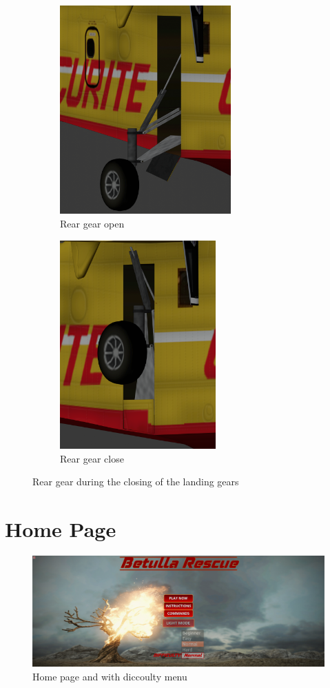 \documentclass{article}
\begin{document}
\begin{figure}[h!]
  \centering
  \begin{subfigure}[h!]{0.4\linewidth}
    \includegraphics[height=80mm]{ImmaginiReport/postopen.png}
    \caption{Rear gear open}
  \end{subfigure}
  \begin{subfigure}[h!]{0.4\linewidth}
    \includegraphics[height=80mm]{ImmaginiReport/postclose.png}
    \caption{Rear gear close}
  \end{subfigure}
  \caption{Rear gear during the closing of the landing gears}
\end{figure}

\newpage
\section*{Home Page}

\begin{figure}[h]
  \includegraphics[width=\linewidth]{ImmaginiReport/initial.png}
  \caption{Home page and with diccoulty menu}
\end{figure}
\end{document}
